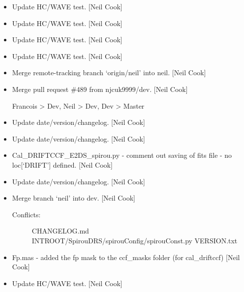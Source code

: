 \documentclass[a4paper,10pt,english]{report}
\begin{document}
\begin{itemize}
\item {} 
Update HC/WAVE test. {[}Neil Cook{]}

\item {} 
Update HC/WAVE test. {[}Neil Cook{]}

\item {} 
Update HC/WAVE test. {[}Neil Cook{]}

\item {} 
Update HC/WAVE test. {[}Neil Cook{]}

\item {} 
Merge remote-tracking branch ‘origin/neil’ into neil. {[}Neil Cook{]}

\item {} 
Merge pull request \#489 from njcuk9999/dev. {[}Neil Cook{]}

Francois \textendash{}\textgreater{} Dev, Neil \textendash{}\textgreater{} Dev, Dev \textendash{}\textgreater{} Master

\item {} 
Update date/version/changelog. {[}Neil Cook{]}

\item {} 
Update date/version/changelog. {[}Neil Cook{]}

\item {} 
Cal\_DRIFTCCF\_E2DS\_spirou.py - comment out saving of fits file - no
loc{[}‘DRIFT’{]} defined. {[}Neil Cook{]}

\item {} 
Update date/version/changelog. {[}Neil Cook{]}

\item {} 
Merge branch ‘neil’ into dev. {[}Neil Cook{]}
\begin{description}
\item[{Conflicts:}] \leavevmode
CHANGELOG.md
INTROOT/SpirouDRS/spirouConfig/spirouConst.py
VERSION.txt

\end{description}

\item {} 
Fp.mas - added the fp mask to the ccf\_masks folder (for cal\_driftccf)
{[}Neil Cook{]}

\item {} 
Update HC/WAVE test. {[}Neil Cook{]}

\end{itemize}
\end{document}
